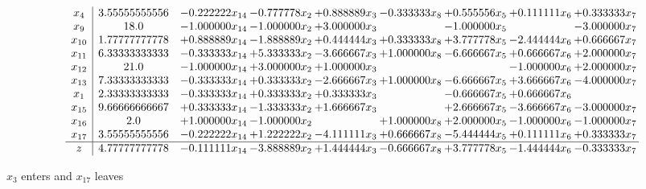 \documentclass[10pt]{article}
\begin{document}
 \[\begin{array}{c| c c@{\hskip 2pt} c@{\hskip 2pt} c@{\hskip 2pt} c@{\hskip 2pt} c@{\hskip 2pt} c@{\hskip 2pt} c@{\hskip 2pt} }
 x_{4}   &  3.55555555556 & -0.222222 x_{14} & -0.777778 x_{2} & + 0.888889 x_{3} & -0.333333 x_{8} & + 0.555556 x_{5} & + 0.111111 x_{6} & + 0.333333 x_{7}\\
 x_{9}   &  18.0 & -1.000000 x_{14} & -1.000000 x_{2} & + 3.000000 x_{3} &   & -1.000000 x_{5} &   & -3.000000 x_{7}\\
 x_{10}   &  1.77777777778 & + 0.888889 x_{14} & -1.888889 x_{2} & + 0.444444 x_{3} & + 0.333333 x_{8} & + 3.777778 x_{5} & -2.444444 x_{6} & + 0.666667 x_{7}\\
 x_{11}   &  6.33333333333 & -0.333333 x_{14} & + 5.333333 x_{2} & -3.666667 x_{3} & + 1.000000 x_{8} & -6.666667 x_{5} & + 0.666667 x_{6} & + 2.000000 x_{7}\\
 x_{12}   &  21.0 & -1.000000 x_{14} & + 3.000000 x_{2} & + 1.000000 x_{3} &    &   & -1.000000 x_{6} & + 2.000000 x_{7}\\
 x_{13}   &  7.33333333333 & -0.333333 x_{14} & + 0.333333 x_{2} & -2.666667 x_{3} & + 1.000000 x_{8} & -6.666667 x_{5} & + 3.666667 x_{6} & -4.000000 x_{7}\\
 x_{1}   &  2.33333333333 & -0.333333 x_{14} & + 0.333333 x_{2} & + 0.333333 x_{3} &   & -0.666667 x_{5} & + 0.666667 x_{6} &   \\
 x_{15}   &  9.66666666667 & + 0.333333 x_{14} & -1.333333 x_{2} & + 1.666667 x_{3} &   & + 2.666667 x_{5} & -3.666667 x_{6} & -3.000000 x_{7}\\
 x_{16}   &  2.0 & + 1.000000 x_{14} & -1.000000 x_{2} &   & + 1.000000 x_{8} & + 2.000000 x_{5} & -1.000000 x_{6} & -1.000000 x_{7}\\
 x_{17}   &  3.55555555556 & -0.222222 x_{14} & + 1.222222 x_{2} & -4.111111 x_{3} & + 0.666667 x_{8} & -5.444444 x_{5} & + 0.111111 x_{6} & + 0.333333 x_{7}\\
\hline
z    &  4.77777777778 & -0.111111 x_{14} & -3.888889 x_{2} & + 1.444444 x_{3} & -0.666667 x_{8} & + 3.777778 x_{5} & -1.444444 x_{6} & -0.333333 x_{7}\\
\end{array}\]


 $ x_{3} $ enters and $ x_{17} $ leaves 
\end{document}
